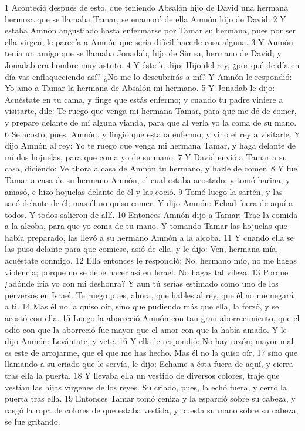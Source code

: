 1 Aconteció después de esto, que teniendo Absalón hijo de David una hermana hermosa que se llamaba Tamar, se enamoró de ella Amnón hijo de David.
2 Y estaba Amnón angustiado hasta enfermarse por Tamar su hermana, pues por ser ella virgen, le parecía a Amnón que sería difícil hacerle cosa alguna.
3 Y Amnón tenía un amigo que se llamaba Jonadab, hijo de Simea, hermano de David; y Jonadab era hombre muy astuto.
4 Y éste le dijo: Hijo del rey, ¿por qué de día en día vas enflaqueciendo así? ¿No me lo descubrirás a mí? Y Amnón le respondió: Yo amo a Tamar la hermana de Absalón mi hermano.
5 Y Jonadab le dijo: Acuéstate en tu cama, y finge que estás enfermo; y cuando tu padre viniere a visitarte, dile: Te ruego que venga mi hermana Tamar, para que me dé de comer, y prepare delante de mí alguna vianda, para que al verla yo la coma de su mano.
6 Se acostó, pues, Amnón, y fingió que estaba enfermo; y vino el rey a visitarle. Y dijo Amnón al rey: Yo te ruego que venga mi hermana Tamar, y haga delante de mí dos hojuelas, para que coma yo de su mano.
7 Y David envió a Tamar a su casa, diciendo: Ve ahora a casa de Amnón tu hermano, y hazle de comer.
8 Y fue Tamar a casa de su hermano Amnón, el cual estaba acostado; y tomó harina, y amasó, e hizo hojuelas delante de él y las coció.
9 Tomó luego la sartén, y las sacó delante de él; mas él no quiso comer. Y dijo Amnón: Echad fuera de aquí a todos. Y todos salieron de allí.
10 Entonces Amnón dijo a Tamar: Trae la comida a la alcoba, para que yo coma de tu mano. Y tomando Tamar las hojuelas que había preparado, las llevó a su hermano Amnón a la alcoba.
11 Y cuando ella se las puso delante para que comiese, asió de ella, y le dijo: Ven, hermana mía, acuéstate conmigo.
12 Ella entonces le respondió: No, hermano mío, no me hagas violencia; porque no se debe hacer así en Israel. No hagas tal vileza.
13 Porque ¿adónde iría yo con mi deshonra? Y aun tú serías estimado como uno de los perversos en Israel. Te ruego pues, ahora, que hables al rey, que él no me negará a ti.
14 Mas él no la quiso oír, sino que pudiendo más que ella, la forzó, y se acostó con ella.
15 Luego la aborreció Amnón con tan gran aborrecimiento, que el odio con que la aborreció fue mayor que el amor con que la había amado. Y le dijo Amnón: Levántate, y vete.
16 Y ella le respondió: No hay razón; mayor mal es este de arrojarme, que el que me has hecho. Mas él no la quiso oír,
17 sino que llamando a su criado que le servía, le dijo: Echame a ésta fuera de aquí, y cierra tras ella la puerta.
18 Y llevaba ella un vestido de diversos colores, traje que vestían las hijas vírgenes de los reyes. Su criado, pues, la echó fuera, y cerró la puerta tras ella.
19 Entonces Tamar tomó ceniza y la esparció sobre su cabeza, y rasgó la ropa de colores de que estaba vestida, y puesta su mano sobre su cabeza, se fue gritando.

